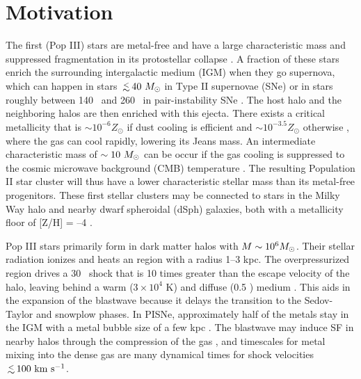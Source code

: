 \documentclass[apjl]{emulateapj}
\begin{document}

\section{Motivation}

The first (Pop III) stars are metal-free and have a large
characteristic mass and suppressed fragmentation in its protostellar
collapse \citep{ABN02, Bromm02_P3, OShea07a}.  A fraction of these
stars enrich the surrounding intergalactic medium (IGM) when they go
supernova, which can happen in stars $\lsim 40~\Ms$ in Type II
supernovae (SNe) or in stars roughly between 140 \Ms~and 260 \Ms~in
pair-instability SNe \citep[PISNe;][]{2002ApJ...567..532H}.  The host
halo and the neighboring halos are then enriched with this ejecta.
There exists a critical metallicity that is $\sim 10^{-6} Z_\odot$ if
dust cooling is efficient \citep{Omukai05, Schneider06_Frag, clark08}
and $\sim 10^{-3.5} Z_\odot$ otherwise \citep{Bromm01,
  2009ApJ...691..441S}, where the gas can cool rapidly, lowering its
Jeans mass.  An intermediate characteristic mass of $\sim10~\Ms$ can
be occur if the gas cooling is suppressed to the cosmic microwave
background (CMB) temperature \citep{Larson98, Tumlinson07_IMF,
  2009ApJ...691..441S}.  The resulting Population II star cluster will
thus have a lower characteristic stellar mass than its metal-free
progenitors.  These first stellar clusters may be connected to stars
in the Milky Way halo and nearby dwarf spheroidal (dSph) galaxies,
both with a metallicity floor of [Z/H] = --4 \citep{Beers05,
  Tafelmeyer10, Frebel10_Obs}.

Pop III stars primarily form in dark matter halos with $M \sim 10^6
\Ms$.  Their stellar radiation ionizes and heats an  region
with a radius 1--3 kpc.  The overpressurized  region drives
a 30 \kms~shock that is 10 times greater than the escape velocity of
the halo, leaving behind a warm ($3 \times 10^4$ K) and diffuse (0.5
\cubecm) medium \citep{Kitayama04, Whalen04, Abel07}.  This aids in
the expansion of the blastwave because it delays the transition to the
Sedov-Taylor and snowplow phases.  In PISNe, approximately half of the
metals stay in the IGM with a metal bubble size of a few kpc
\citep{Wise08_Gal, Greif10}.  The blastwave may induce SF in nearby
halos through the compression of the gas \citep{Ferrara98}, and
timescales for metal mixing into the dense gas are many dynamical
times \citep{Cen08} for shock velocities $\lsim100~\kms$.
\end{document}
